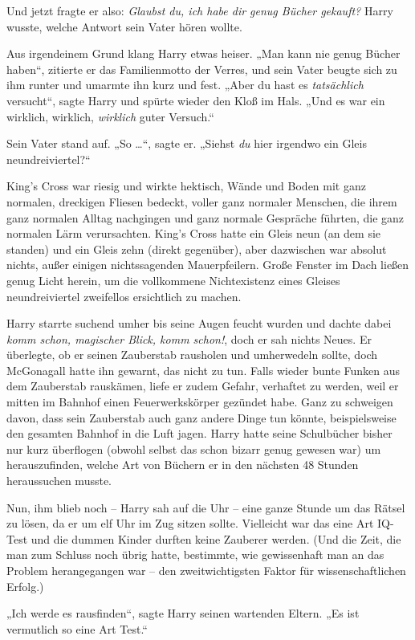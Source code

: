 {Und jetzt fragte er also: \emph{Glaubst du, ich habe dir genug Bücher gekauft?} Harry wusste, welche Antwort sein Vater hören wollte.

Aus irgendeinem Grund klang Harry etwas heiser. „Man kann nie genug Bücher haben“, zitierte er das Familienmotto der Verres, und sein Vater beugte sich zu ihm runter und umarmte ihn kurz und fest. „Aber du hast es \emph{tatsächlich} versucht“, sagte Harry und spürte wieder den Kloß im Hals. „Und es war ein wirklich, wirklich, \emph{wirklich} guter Versuch.“

Sein Vater stand auf. „So …“, sagte er. „Siehst \emph{du} hier irgendwo ein Gleis neundreiviertel?“

King's Cross war riesig und wirkte hektisch, Wände und Boden mit ganz normalen, dreckigen Fliesen bedeckt, voller ganz normaler Menschen, die ihrem ganz normalen Alltag nachgingen und ganz normale Gespräche führten, die ganz normalen Lärm verursachten. King's Cross hatte ein Gleis neun (an dem sie standen) und ein Gleis zehn (direkt gegenüber), aber dazwischen war absolut nichts, außer einigen nichtssagenden Mauerpfeilern. Große Fenster im Dach ließen genug Licht herein, um die vollkommene Nichtexistenz eines Gleises neundreiviertel zweifellos ersichtlich zu machen.

Harry starrte suchend umher bis seine Augen feucht wurden und dachte dabei \emph{komm schon, magischer Blick, komm schon!}, doch er sah nichts Neues. Er überlegte, ob er seinen Zauberstab rausholen und umherwedeln sollte, doch McGonagall hatte ihn gewarnt, das nicht zu tun. Falls wieder bunte Funken aus dem Zauberstab rauskämen, liefe er zudem Gefahr, verhaftet zu werden, weil er mitten im Bahnhof einen Feuerwerkskörper gezündet habe. Ganz zu schweigen davon, dass sein Zauberstab auch ganz andere Dinge tun könnte, beispielsweise den gesamten Bahnhof in die Luft jagen. Harry hatte seine Schulbücher bisher nur kurz überflogen (obwohl selbst das schon bizarr genug gewesen war) um herauszufinden, welche Art von Büchern er in den nächsten 48 Stunden heraussuchen musste.

Nun, ihm blieb noch -- Harry sah auf die Uhr -- eine ganze Stunde um das Rätsel zu lösen, da er um elf Uhr im Zug sitzen sollte. Vielleicht war das eine Art IQ-Test und die dummen Kinder durften keine Zauberer werden. (Und die Zeit, die man zum Schluss noch übrig hatte, bestimmte, wie gewissenhaft man an das Problem herangegangen war -- den zweitwichtigsten Faktor für wissenschaftlichen Erfolg.)

„Ich werde es rausfinden“, sagte Harry seinen wartenden Eltern. „Es ist vermutlich so eine Art Test.“

}
